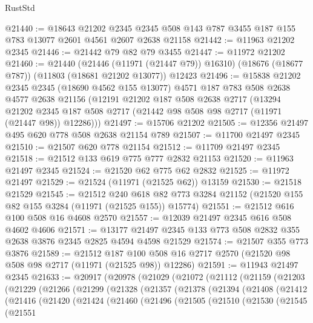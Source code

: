 \begin{lexlean}{RustStd}
\begin{coremodule}
@21440 := @18643
    @21202
    @2345
    @2345
    @508
    @143
    @787
    @3455
    @187
    @155
    @783
    @13077
    @2601
    @4561
    @2607
    @2638
    @21158
@21442 := @11963 @21202 @2345
@21446 := @21442 @79 @82 @79 @3455
@21447 := @11972 @21202
@21460 := @21440
    (@21446 (@11971 (@21447 @79)) @16310)
    (@18676 (@18677 @787))
    (@11803 (@18681 @21202 @13077))
    @12423
@21496 := @15838
    @21202
    @2345
    @2345
    (@18690 @4562 @155 @13077)
    @4571
    @187
    @783
    @508
    @2638
    @4577
    @2638
    @21156
    (@12191
      @21202
      @187
      @508
      @2638
      @2717
      (@13294
        @21202
        @2345
        @187
        @508
        @2717
        (@21442 @98 @508 @98 @2717 (@11971 (@21447 @98)) @12286)))
@21497 := @15706 @21202
@21505 := @12356 @21497 @495 @620 @778 @508 @2638 @21154 @789
@21507 := @11700 @21497 @2345
@21510 := @21507 @620 @778 @21154
@21512 := @11709 @21497 @2345
@21518 := @21512 @133 @619 @775 @777 @2832 @21153
@21520 := @11963 @21497 @2345
@21524 := @21520 @62 @775 @62 @2832
@21525 := @11972 @21497
@21529 := @21524 (@11971 (@21525 @62)) @13159
@21530 := @21518 @21529
@21545 := @21512
    @240
    @618
    @82
    @773
    @3284
    @21152
    (@21520 @155 @82 @155 @3284 (@11971 (@21525 @155)) @15774)
@21551 := @21512 @616 @100 @508 @16 @4608 @2570
@21557 := @12039 @21497 @2345 @616 @508 @4602 @4606
@21571 := @13177 @21497 @2345 @133 @773 @508 @2832 @355 @2638 @3876 @2345 @2825 @4594 @4598 @21529
@21574 := @21507 @355 @773 @3876
@21589 := @21512
    @187
    @100
    @508
    @16
    @2717
    @2570
    (@21520 @98 @508 @98 @2717 (@11971 (@21525 @98)) @12286)
@21591 := @11943 @21497 @2345
@21633 := @20917
    (@20978
      (@21029
        (@21072
          (@21112
            (@21159
              (@21203
                (@21229
                  (@21266
                    (@21299
                      (@21328
                        (@21357
                          (@21378
                            (@21394
                              (@21408
                                (@21412
                                  (@21416
                                    (@21420
                                      (@21424
                                        (@21460
                                          (@21496
                                            (@21505
                                              (@21510
                                                (@21530
                                                  (@21545
                                                    (@21551

\end{coremodule}
\end{lexlean}
